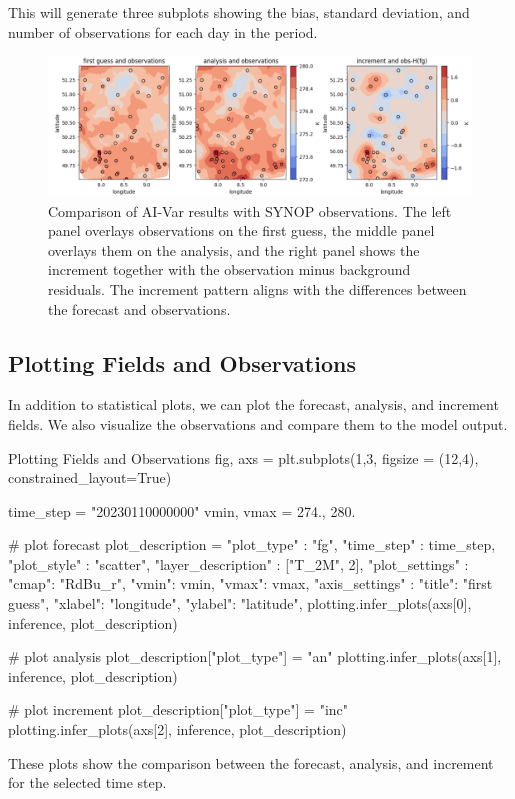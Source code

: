 This will generate three subplots showing the bias, standard deviation, and number of observations for each day in the period.

\begin{figure}[ht]
\centering
\includegraphics[width=\textwidth]{images/aivar5.png}
\caption{Comparison of AI-Var results with SYNOP observations. The left panel overlays observations on the first guess, the middle panel overlays them on the analysis, and the right panel shows the increment together with the observation minus background residuals. The increment pattern aligns with the differences between the forecast and observations.}
\end{figure}

%
\subsection{Plotting Fields and Observations}

In addition to statistical plots, we can plot the forecast, analysis, and increment fields. We also visualize the observations and compare them to the model output.

\begin{codeonly}{Plotting Fields and Observations}
fig, axs = plt.subplots(1,3, figsize = (12,4), constrained_layout=True)

time_step = "20230110000000"
vmin, vmax = 274., 280.

# plot forecast
plot_description = {
     "plot_type" : "fg",
     "time_step" : time_step,
     "plot_style" : "scatter",
     "layer_description" : ["T_2M", 2],
     "plot_settings" : {"cmap": "RdBu_r", "vmin": vmin, "vmax": vmax},
     "axis_settings" : {"title": "first guess", "xlabel": "longitude", "ylabel": "latitude"},
}
plotting.infer_plots(axs[0], inference, plot_description)

# plot analysis
plot_description["plot_type"] = "an"
plotting.infer_plots(axs[1], inference, plot_description)

# plot increment
plot_description["plot_type"] = "inc"
plotting.infer_plots(axs[2], inference, plot_description)
\end{codeonly}

These plots show the comparison between the forecast, analysis, and increment for the selected time step.

